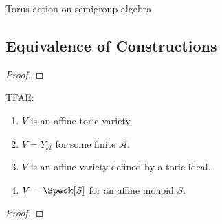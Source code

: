 \begin{definition}
  \label{torActOnAlg}
  Torus action on semigroup algebra
\end{definition}


\subsection{Equivalence of Constructions}


\begin{lemma}
  \label{lmm:1-1-16}
\end{lemma}
\begin{proof}

\end{proof}


\begin{theorem}
  \label{thm:1-1-17}
  TFAE:
  \begin{enumerate}
    \item $V$ is an affine toric variety.
    \item $V = Y_{\mathcal A}$ for some finite $\mathcal A$.
    \item $V$ is an affine variety defined by a toric ideal.
    \item $V = \Spec \Bbbk[S]$ for an affine monoid $S$.
  \end{enumerate}
\end{theorem}
\begin{proof}

\end{proof}
